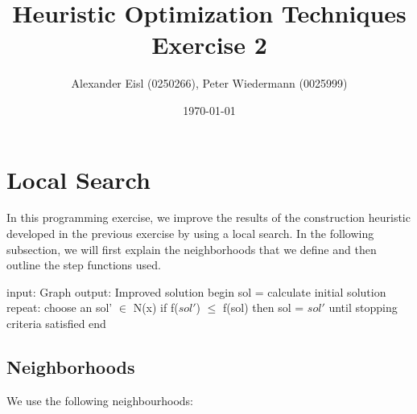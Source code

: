 \documentclass{scrartcl}
\author{Alexander Eisl (0250266), Peter Wiedermann (0025999)}
\date{\today}
\title{Heuristic Optimization Techniques \\ Exercise 2}
\begin{document}
\maketitle


\section{Local Search}
\label{sec:deterministic}
In this programming exercise, we improve the results of the
construction heuristic developed in the previous exercise by using a
local search. In the following subsection, we will first explain the
neighborhoods that we define and then outline the step functions used.

\begin{algorithm}[caption={Local search}]
    input: Graph 
    output: Improved solution
    begin
    	sol = calculate initial solution
	repeat:
		choose an sol' $\in$ N(x) 
		if f($sol'$) $\leq$ f(sol) then
			sol = $sol'$
	until stopping criteria satisfied
    end
\end{algorithm}

\subsection{Neighborhoods}
\label{neighborhoods}
We use the following neighbourhoods:
\end{document}
